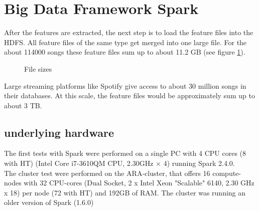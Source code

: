 
\section{Big Data Framework Spark}\label{bds1}

After the features are extracted, the next step is to load the feature files into the HDFS.
All feature files of the same type get merged into one large file. For the about 114000 songs these feature files sum up to about 11.2 GB (see figure \ref{filesize}). 

\begin{figure}[htbp]
	\centering
	\caption{File sizes}
	\label{filesize}
\end{figure}

\noindent Large streaming platforms like Spotify give access to about 30 million songs in their databases. At this scale, the feature files would be approximately sum up to about 3 TB.\\

\subsection{underlying hardware}

The first tests with Spark were performed on a single PC with 4 CPU cores (8 with HT) (Intel Core i7-3610QM CPU, 2.30GHz × 4) running Spark 2.4.0.\\ The cluster test were performed on the ARA-cluster, that offers 16 compute-nodes with 32 CPU-cores (Dual Socket, 2 x Intel Xeon "Scalable" 6140, 2.30 GHz x 18) per node (72 with HT) and 192GB of RAM. The cluster was running an older version of Spark (1.6.0)\\

